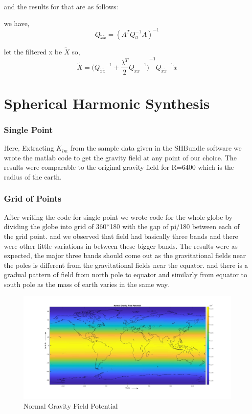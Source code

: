 \documentclass[a4paper,12pt]{report}
\begin{document}
 and the results for that are as follows:
 
 we have,
 \begin{equation}
 Q_{\tilde{x}\tilde{x}} = (A^T Q_{ll}^{-1} A)^{-1}
 \end{equation}
 
 let the filtered x be $\widetilde{X}$
 so, 
 \begin{equation}
 \widetilde{X}= {\Bigg( {Q_{\tilde{x}\tilde{x}}}^{-1} + \frac{\lambda^T}{2}{Q_{xx}}^{-1} \Bigg)}^{-1} {Q_{\tilde{x}     \tilde{x}}}^{-1}  \tilde{x}
 \end{equation}

\chapter{Spherical Harmonic Synthesis}

\subsection{Single Point}
Here, Extracting $K_{lm}$ from the sample data given in the SHBundle software we wrote the matlab code to get the gravity field at any point of our choice.
The results were comparable to the original gravity field for R=6400 which is the radius of the earth.
\subsection{ Grid of Points}

After writing the code for single point we wrote code for the whole globe by dividing the globe into grid of 360*180 with the gap of pi/180 between each of the grid point.
and we observed that field had basically three bands and there were other little variations in between these bigger bands. The results were as expected, the major three bands should come out as the gravitational fields near the poles is different from the gravitational fields near the equator. and there is a gradual pattern of field from north pole to equator and similarly from equator to south pole as the mass of earth varies in the same way.

\begin{figure}[!h]
    \centering
    \includegraphics[width=0.96\linewidth]{Normal_grid}
    \caption{Normal Gravity Field Potential}
    
\end{figure}
\end{document}
